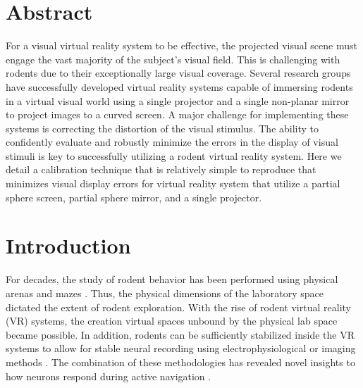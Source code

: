\documentclass[10pt,letterpaper]{article}
\begin{document}
\section*{Abstract}
For a visual virtual reality system to be effective, the projected visual scene must engage the vast majority of the subject's visual field. 
This is challenging with rodents due to their exceptionally large visual coverage. Several research groups have successfully developed 
virtual reality systems capable of immersing rodents in a virtual visual world using a single projector and a single non-planar mirror to 
project images to a curved screen. A major challenge for implementing these systems is correcting the distortion of the visual stimulus. 
The ability to confidently evaluate and robustly minimize the errors in the display of visual stimuli is key to successfully utilizing a rodent 
virtual reality system. Here we detail a calibration technique that is relatively simple to reproduce that minimizes visual display errors for 
virtual reality system that utilize a partial sphere screen, partial sphere mirror, and a single projector.



\linenumbers

\section*{Introduction}
For decades, the study of rodent behavior has been performed using physical arenas and mazes \cite{Moser2008RodentSpaceRev}. 
Thus, the physical dimensions of the laboratory space dictated the extent of rodent exploration. With the rise of rodent virtual reality 
(VR) systems, the creation virtual spaces unbound by the physical lab space became possible. In addition, rodents can be sufficiently 
stabilized inside the VR systems to allow for stable neural recording using electrophysiological or imaging methods 
\cite{harvey2009intracellular, schmidt2013cellular, aronov2014engagement, keller2012sensorimotor, ayaz2013locomotion, saleem2013integration}. 
The combination of these methodologies has revealed novel insights to how neurons respond during active navigation 
\cite{harvey2009intracellular, schmidt2013cellular, aronov2014engagement, keller2012sensorimotor, ayaz2013locomotion, saleem2013integration}.
\end{document}

